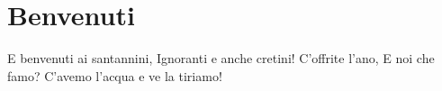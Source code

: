 \section{Benvenuti}
\subtitle{Sulla melodia di “La società dei Magnaccioni” di Lando Fiorini}
\begin{canzone}
E benvenuti ai santannini,
Ignoranti e anche cretini!
C’offrite l’ano,
E noi che famo?
C’avemo l’acqua e ve la tiriamo!
\end{canzone}
